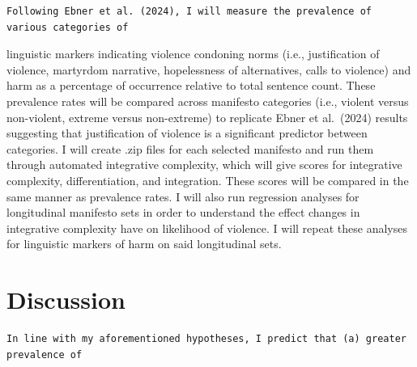\documentclass[
  english,
  man]{apa6}
\begin{document}
\begin{verbatim}
Following Ebner et al. (2024), I will measure the prevalence of various categories of 
\end{verbatim}

linguistic markers indicating violence condoning norms (i.e., justification of violence,
martyrdom narrative, hopelessness of alternatives, calls to violence) and harm as a
percentage of occurrence relative to total sentence count. These prevalence rates will be
compared across manifesto categories (i.e., violent versus non-violent, extreme versus
non-extreme) to replicate Ebner et al.~(2024) results suggesting that justification of
violence is a significant predictor between categories. I will create .zip files for each
selected manifesto and run them through automated integrative complexity, which will give
scores for integrative complexity, differentiation, and integration. These scores will be
compared in the same manner as prevalence rates. I will also run regression analyses for
longitudinal manifesto sets in order to understand the effect changes in integrative
complexity have on likelihood of violence. I will repeat these analyses for linguistic
markers of harm on said longitudinal sets.

\section{Discussion}\label{discussion}

\begin{verbatim}
In line with my aforementioned hypotheses, I predict that (a) greater prevalence of 
\end{verbatim}
\end{document}
